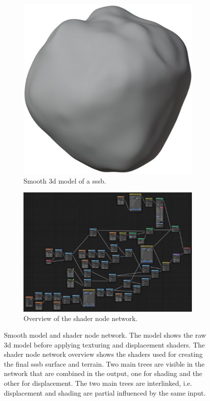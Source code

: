 \begin{figure}[htb]
    \centering
    \begin{subfigure}[b]{0.48\textwidth}
        \centering
        \includegraphics[width=.7\textwidth]{doc/thesis/0_figures/procedural_terrain/smooth_model.png}
        \caption{Smooth \gls{3d} model of a \gls{sssb}.}
        \label{fig:smooth_model}
    \end{subfigure}
    \begin{subfigure}[b]{0.48\textwidth}
        \centering
        \includegraphics[width=\textwidth]{doc/thesis/0_figures/procedural_terrain/node_network.png}
        \caption{Overview of the shader node network.}
        \label{fig:shader_nodes}
    \end{subfigure}
    \caption{Smooth model and shader node network. The model shows the raw \gls{3d} model before applying texturing and displacement shaders. The shader node network overview shows the shaders used for creating the final \gls{sssb} surface and terrain. Two main trees are visible in the network that are combined in the output, one for shading and the other for displacement. The two main trees are interlinked, i.e. displacement and shading are partial influenced by the same input.}
\end{figure}


